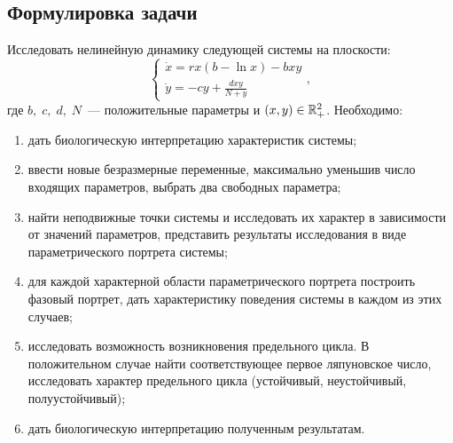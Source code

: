 \subsection{Формулировка задачи}

Исследовать нелинейную динамику следующей системы на плоскости:
\begin{equation}\label{eq:continuous_system}
        \left\{
        \begin{array}{ll}
                \dot x = rx(b - \ln x) - bxy \\
                \dot y = -cy + \frac{dxy}{N+y}
        \end{array}
        \right.,
\end{equation}
где $b,\; c,\; d,\; N$~--- положительные параметры и $(x, y) \in \mathbb{R}^2_+$. Необходимо:
\begin{enumerate}
        \item 
                дать биологическую интерпретацию характеристик системы;
        \item
                ввести новые безразмерные переменные, максимально уменьшив число входящих параметров, выбрать два свободных параметра;
        \item
                найти неподвижные точки системы и исследовать их характер в зависимости от значений параметров, представить результаты исследования в виде параметрического портрета системы;
        \item
                для каждой характерной области параметрического портрета построить фазовый портрет, дать характеристику поведения системы в каждом из этих случаев;
        \item
                исследовать возможность возникновения предельного цикла. В положительном случае найти соответствующее первое ляпуновское число, исследовать характер предельного цикла (устойчивый, неустойчивый, полуустойчивый);
        \item
                дать биологическую интерпретацию полученным результатам.
\end{enumerate}
